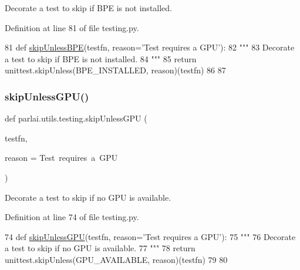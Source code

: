 \begin{DoxyVerb}Decorate a test to skip if BPE is not installed.
\end{DoxyVerb}
 

Definition at line 81 of file testing.\+py.


\begin{DoxyCode}
81 \textcolor{keyword}{def }\hyperlink{namespaceparlai_1_1utils_1_1testing_ab04af7a525a569f29b936b54b32899b7}{skipUnlessBPE}(testfn, reason='Test requires a GPU'):
82     \textcolor{stringliteral}{"""}
83 \textcolor{stringliteral}{    Decorate a test to skip if BPE is not installed.}
84 \textcolor{stringliteral}{    """}
85     \textcolor{keywordflow}{return} unittest.skipUnless(BPE\_INSTALLED, reason)(testfn)
86 
87 
\end{DoxyCode}
\mbox{\label{namespaceparlai_1_1utils_1_1testing_a2773d8b6d4631fa1f639dde415eb3e2b}} 
\subsubsection{\texorpdfstring{skip\+Unless\+G\+P\+U()}{skipUnlessGPU()}}
{\footnotesize\ttfamily def parlai.\+utils.\+testing.\+skip\+Unless\+G\+PU (\begin{DoxyParamCaption}\item[{}]{testfn,  }\item[{}]{reason = {\ttfamily \textquotesingle{}Test~requires~a~GPU\textquotesingle{}} }\end{DoxyParamCaption})}

\begin{DoxyVerb}Decorate a test to skip if no GPU is available.
\end{DoxyVerb}
 

Definition at line 74 of file testing.\+py.


\begin{DoxyCode}
74 \textcolor{keyword}{def }\hyperlink{namespaceparlai_1_1utils_1_1testing_a2773d8b6d4631fa1f639dde415eb3e2b}{skipUnlessGPU}(testfn, reason='Test requires a GPU'):
75     \textcolor{stringliteral}{"""}
76 \textcolor{stringliteral}{    Decorate a test to skip if no GPU is available.}
77 \textcolor{stringliteral}{    """}
78     \textcolor{keywordflow}{return} unittest.skipUnless(GPU\_AVAILABLE, reason)(testfn)
79 
80 
\end{DoxyCode}
\mbox{\label{namespaceparlai_1_1utils_1_1testing_a7b182622aebc6cdc41ee3b99ebe47432}} 
